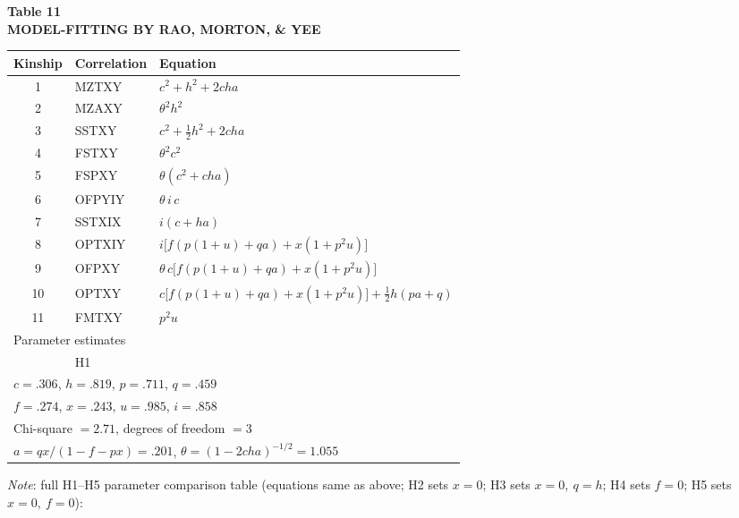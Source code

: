 ﻿\documentclass[12pt]{article}
\begin{document}
\begin{center}
\textbf{Table 11}\\
\textbf{MODEL-FITTING BY RAO, MORTON, \& YEE}
\end{center}
\begin{center}
\small
\begin{tabular}{c l l}
\hline
Kinship & Correlation & Equation \\
\hline
1 & MZTXY & $c^2+h^2+2cha$ \\
2 & MZAXY & $\theta^2 h^2$ \\
3 & SSTXY & $c^2+\tfrac12 h^2+2cha$ \\
4 & FSTXY & $\theta^2 c^2$ \\
5 & FSPXY & $\theta(c^2+cha)$ \\
6 & OFPYIY & $\theta\,i\,c$ \\
7 & SSTXIX & $i(c+ha)$ \\
8 & OPTXIY & $i\big[f(p(1+u)+qa) + x(1+p^2u)\big]$ \\
9 & OFPXY & $\theta\,c\big[f(p(1+u)+qa) + x(1+p^2u)\big]$ \\
10 & OPTXY & $c\big[f(p(1+u)+qa) + x(1+p^2u)\big] + \tfrac12 h(pa+q)$ \\
11 & FMTXY & $p^2 u$ \\
\hline
\multicolumn{3}{l}{Parameter estimates} \\
\hline
 & H1 & \\
\multicolumn{3}{l}{$c=.306$, \quad $h=.819$, \quad $p=.711$, \quad $q=.459$} \\
\multicolumn{3}{l}{$f=.274$, \quad $x=.243$, \quad $u=.985$, \quad $i=.858$} \\
\multicolumn{3}{l}{Chi-square $=2.71$, degrees of freedom $=3$} \\
\multicolumn{3}{l}{$a = qx/(1-f-px) = .201$, \quad $\theta = (1-2cha)^{-1/2}=1.055$} \\
\hline
\end{tabular}
\end{center}
\emph{Note}: full H1--H5 parameter comparison table (equations same as above; H2 sets $x=0$; H3 sets $x=0,\ q=h$; H4 sets $f=0$; H5 sets $x=0,\ f=0$):
\end{document}
